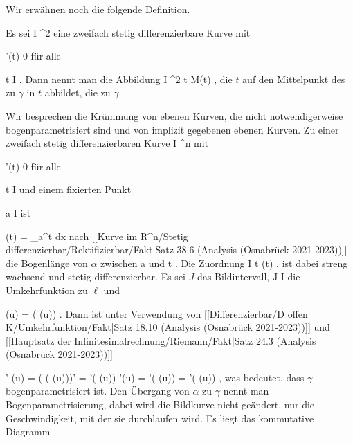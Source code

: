 Wir erwähnen noch die folgende Definition.

{}
{

Es sei
\maabb {\gamma} { I } { \R^2
} {}
eine zweifach stetig differenzierbare Kurve mit

\mavergleichskette
{\vergleichskette
{ \gamma'(t)
}
{ \neq }{ 0
}
{  }{
}
{    }{
}
{   }{
}
}
{}{}{}
für alle

\mavergleichskette
{\vergleichskette
{ t
}
{ \in }{ I
}
{  }{
}
{    }{
}
{   }{
}
}
{}{}{.}
Dann nennt man die Abbildung
\maabbeledisp {} { I } { \R^2
} { t } { M(t)
} {,}
die $t$ auf den Mittelpunkt des
zu $\gamma$ in $t$ abbildet, die
zu $\gamma$.

}


Wir besprechen die Krümmung von ebenen Kurven, die nicht notwendigerweise bogenparametrisiert sind und von implizit gegebenen ebenen Kurven. Zu einer zweifach stetig differenzierbaren Kurve
\maabbdisp {\alpha} {I} { \R^n
} {}
mit

\mavergleichskette
{\vergleichskette
{ \alpha'(t)
}
{ \neq }{ 0
}
{  }{
}
{    }{
}
{   }{
}
}
{}{}{}
für alle

\mavergleichskette
{\vergleichskette
{ t
}
{ \in }{ I
}
{  }{
}
{    }{
}
{   }{
}
}
{}{}{}
und einem fixierten Punkt

\mavergleichskette
{\vergleichskette
{ a
}
{ \in }{ I
}
{  }{
}
{    }{
}
{   }{
}
}
{}{}{}
ist

\mavergleichskettedisp
{\vergleichskette
{ \ell(t)
}
{ =} { \int_a^t  \Vert dx
}
{ } {
}
{ } {
}
{ } {
}
}
{}{}{}
nach
[[Kurve im R^n/Stetig differenzierbar/Rektifizierbar/Fakt|Satz 38.6 (Analysis (Osnabrück 2021-2023))]]
die Bogenlänge von $\alpha$ zwischen
\mathkor {} {a} {und} {t} {.}
Die Zuordnung
\maabbeledisp {\ell} {I} { \R
} {t} { \ell(t)
} {,}
ist dabei streng wachsend und stetig differenzierbar. Es sei $J$ das Bildintervall,
\maabb {\beta} {J} {I
} {}
die Umkehrfunktion zu $\ell$ und

\mavergleichskette
{\vergleichskette
{  \gamma (u)
}
{ = }{  \alpha( \beta(u))
}
{  }{
}
{    }{
}
{   }{
}
}
{}{}{.}
Dann ist unter Verwendung von
[[Differenzierbar/D offen K/Umkehrfunktion/Fakt|Satz 18.10 (Analysis (Osnabrück 2021-2023))]]
und
[[Hauptsatz der Infinitesimalrechnung/Riemann/Fakt|Satz 24.3 (Analysis (Osnabrück 2021-2023))]]

\mavergleichskettealign
{\vergleichskettealign
{ \gamma' (u)
}
{ =} { ( \alpha( \beta(u)))'
}
{ =} { \alpha'( \beta(u)) \beta'(u)
}
{ =} { \alpha'( \beta(u)) {  }
}
{ =} { \alpha'( \beta(u)) {  }
}
}
{}
{}{,}
was bedeutet, dass $\gamma$ bogenparametrisiert ist. Den Übergang von $\alpha$ zu  $\gamma$ nennt man Bogenparametrisierung, dabei wird die Bildkurve nicht geändert, nur die Geschwindigkeit, mit der sie durchlaufen wird. Es liegt das kommutative Diagramm

